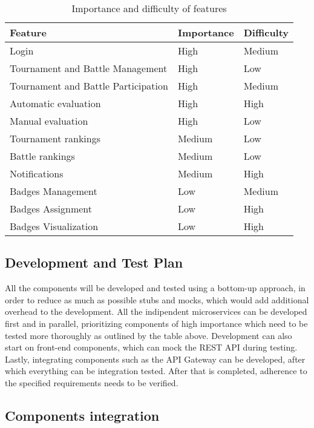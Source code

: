 \begin{table}[H]
     \centering
     \begin{tabular}{|l|l|l|}
          \hline
          \textbf{Feature}                    & \textbf{Importance} & \textbf{Difficulty} \\\hline
          Login                               & High                & Medium              \\
          Tournament and Battle Management    & High                & Low                 \\
          Tournament and Battle Participation & High                & Medium              \\
          Automatic evaluation                & High                & High                \\
          Manual evaluation                   & High                & Low                 \\
          Tournament rankings                 & Medium              & Low                 \\
          Battle rankings                     & Medium              & Low                 \\
          Notifications                       & Medium              & High                \\
          Badges Management                   & Low                 & Medium              \\
          Badges Assignment                   & Low                 & High                \\
          Badges Visualization                & Low                 & High                \\
     \end{tabular}
     \caption{Importance and difficulty of features}
     \label{table:Importance and difficulty of features}
\end{table}

\subsection{Development and Test Plan}
All the components will be developed and tested using a bottom-up approach, in order to reduce as
much as possible stubs and mocks, which would add additional overhead to the development.
All the indipendent microservices can be developed first and in parallel, prioritizing components 
of high importance which need to be tested more thoroughly as outlined by the table above.
Development can also start on front-end components, which can mock the REST API during testing.
Lastly, integrating components such as the API Gateway can be developed, after which everything
can be integration tested. After that is completed, adherence to the specified requirements
needs to be verified.

\subsection{Components integration}

